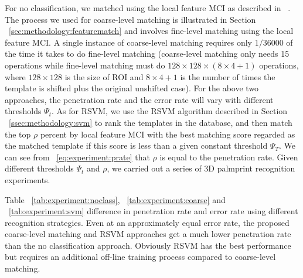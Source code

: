 For no classification, we matched using the local feature MCI as described in ~\cite{Zhang:2009dp}. The process we used for coarse-level matching is illustrated in Section ~\ref{sec:methodology:featurematch} and involves fine-level matching using the local feature MCI. A single instance of coarse-level matching requires only $1/36000$ of the time it takes to do fine-level matching (coarse-level matching only needs 15 operations while fine-level matching must do $128\times128\times(8\times4+1)$ operations, where $128\times128$ is the size of ROI and $8\times4+1$ is the number of times the template is shifted plus the original unshifted case). For the above two approaches, the penetration rate and the error rate will vary with different thresholds $\Psi_t$. As for RSVM, we use the RSVM algorithm described in Section ~\ref{ssec:methodology:svm} to rank the templates in the database, and then match the top $\rho$ percent by local feature MCI with the best matching score regarded as the matched template if this score is less than a given constant threshold $\Psi_T$. We can see from ~\ref{eq:experiment:prate} that $\rho$ is equal to the penetration rate. Given different thresholds $\Psi_t$ and $\rho$, we carried out a series of 3D palmprint recognition experiments.





Table ~\ref{tab:experiment:noclass}, ~\ref{tab:experiment:coarse} and ~\ref{tab:experiment:svm} difference in penetration rate and error rate using different recognition strategies. Even at an approximately equal error rate, the proposed coarse-level matching and RSVM approaches get a much lower penetration rate than the no classification approach. Obviously RSVM has the best performance but requires an additional off-line training process compared to coarse-level matching.


